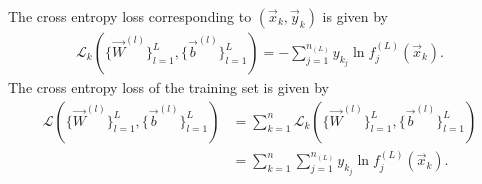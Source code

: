 \begin{definition}
The cross entropy loss corresponding to $(\vec{x}_k, \vec{y}_k)$ is given by 
\begin{align*}
    \mathcal{L}_{k}(\{ \vec{W}^{(l)} \}_{l=1}^{L},\{ \vec{b}^{(l)} \}_{l=1}^{L}) = - \sum_{j=1}^{n_{(L)}} y_{k_{j}} \ln{{f}^{(L)}_j(\vec{x}_k) }.
\end{align*}
The cross entropy loss of the training set is given by
\begin{align*}
    \mathcal{L}(\{ \vec{W}^{(l)} \}_{l=1}^{L},\{ \vec{b}^{(l)} \}_{l=1}^{L}) &= \sum_{k = 1}^n \mathcal{L}_{k}(\{ \vec{W}^{(l)} \}_{l=1}^{L},\{ \vec{b}^{(l)} \}_{l=1}^{L} ) \\ 
                                                                             &= \sum_{k = 1}^n \sum_{j=1}^{n_{(L)}} y_{k_{j}} \ln{f^{(L)}_j(\vec{x}_k) }.
\end{align*}
\end{definition}
